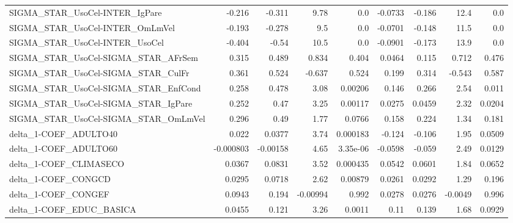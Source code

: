 \begin{tabular}{lrrrrrrrr}
SIGMA\_STAR\_UsoCel-INTER\_IgPare        &      -0.216 &       -0.311 &     9.78 &      0.0 &    -0.0733 &      -0.186 &         12.4 &           0.0 \\
SIGMA\_STAR\_UsoCel-INTER\_OmLmVel       &      -0.193 &       -0.278 &      9.5 &      0.0 &    -0.0701 &      -0.148 &         11.5 &           0.0 \\
SIGMA\_STAR\_UsoCel-INTER\_UsoCel        &      -0.404 &        -0.54 &     10.5 &      0.0 &    -0.0901 &      -0.173 &         13.9 &           0.0 \\
SIGMA\_STAR\_UsoCel-SIGMA\_STAR\_AFrSem   &       0.315 &        0.489 &    0.834 &    0.404 &     0.0464 &       0.115 &        0.712 &         0.476 \\
SIGMA\_STAR\_UsoCel-SIGMA\_STAR\_CulFr    &       0.361 &        0.524 &   -0.637 &    0.524 &      0.199 &       0.314 &       -0.543 &         0.587 \\
SIGMA\_STAR\_UsoCel-SIGMA\_STAR\_EnfCond  &       0.258 &        0.478 &     3.08 &  0.00206 &      0.146 &       0.266 &         2.54 &         0.011 \\
SIGMA\_STAR\_UsoCel-SIGMA\_STAR\_IgPare   &       0.252 &         0.47 &     3.25 &  0.00117 &     0.0275 &      0.0459 &         2.32 &        0.0204 \\
SIGMA\_STAR\_UsoCel-SIGMA\_STAR\_OmLmVel  &       0.296 &         0.49 &     1.77 &   0.0766 &      0.158 &       0.224 &         1.34 &         0.181 \\
delta\_1-COEF\_ADULTO40                 &       0.022 &       0.0377 &     3.74 & 0.000183 &     -0.124 &      -0.106 &         1.95 &        0.0509 \\
delta\_1-COEF\_ADULTO60                 &   -0.000803 &     -0.00158 &     4.65 & 3.35e-06 &    -0.0598 &      -0.059 &         2.49 &        0.0129 \\
delta\_1-COEF\_CLIMASECO                &      0.0367 &       0.0831 &     3.52 & 0.000435 &     0.0542 &      0.0601 &         1.84 &        0.0652 \\
delta\_1-COEF\_CONGCD                   &      0.0295 &       0.0718 &     2.62 &  0.00879 &     0.0261 &      0.0292 &         1.29 &         0.196 \\
delta\_1-COEF\_CONGEF                   &      0.0943 &        0.194 & -0.00994 &    0.992 &     0.0278 &      0.0276 &      -0.0049 &         0.996 \\
delta\_1-COEF\_EDUC\_BASICA              &      0.0455 &        0.121 &     3.26 &   0.0011 &       0.11 &       0.139 &         1.68 &        0.0929 \\

\end{tabular}
